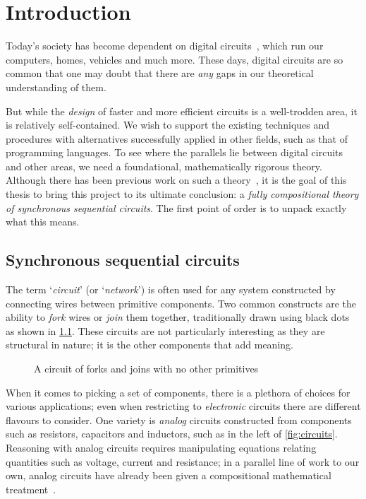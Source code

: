 \chapter{Introduction}

Today's society has become dependent on digital
circuits~\cite{katz2005contemporary}, which run our computers, homes, vehicles
and much more.
These days, digital circuits are so common that one may doubt that there are
\emph{any} gaps in our theoretical understanding of them.

But while the \emph{design} of faster and more efficient circuits is a
well-trodden area, it is relatively self-contained.
We wish to support the existing techniques and procedures with alternatives
successfully applied in other fields, such as that of programming languages.
To see where the parallels lie between digital circuits and other areas,
we need a foundational, mathematically rigorous theory.
Although there has been previous work on such a
theory~\cite{lafont2003algebraic,ghica2017diagrammatic,ghica2018structural}, it
is the goal of this thesis to bring this project to its ultimate conclusion:
a \emph{fully compositional theory of synchronous sequential circuits}.
The first point of order is to unpack exactly what this means.

\section{Synchronous sequential circuits}

The term `\emph{circuit}' (or `\emph{network}') is often used for any system
constructed by connecting wires between primitive components.
Two common constructs are the ability to \emph{fork} wires or \emph{join} them
together, traditionally drawn using black dots as shown in \cref{fig:forkjoin}.
These circuits are not particularly interesting as they are structural in
nature; it is the other components that add meaning.

\begin{figure}
    \centering
    \caption{
        A circuit of forks and joins with no other primitives
    }
    \label{fig:forkjoin}
\end{figure}

When it comes to picking a set of components, there is a plethora of choices
for various applications; even when restricting to \emph{electronic} circuits
there are different flavours to consider.
One variety is \emph{analog} circuits constructed from components such
as resistors, capacitors and inductors, such as in the left of
\cref{fig:circuits}.
Reasoning with analog circuits requires manipulating equations relating
quantities such as voltage, current and resistance; in a parallel line of work
to our own, analog circuits have already been given a compositional mathematical
treatment~\cite{boisseau2022string}.

